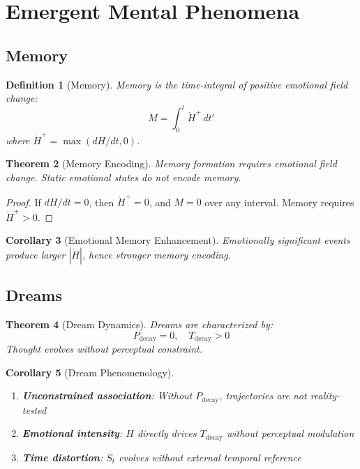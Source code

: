 \documentclass[twocolumn,amsmath,amssymb,aps,prl,superscriptaddress]{revtex4-2}
\newtheorem{theorem}{Theorem}[section]
\newtheorem{corollary}[theorem]{Corollary}
\newtheorem{definition}[theorem]{Definition}
\newcommand{\St}{S_t}
\newcommand{\Pdecay}{P_{\text{decay}}}
\newcommand{\Tdecay}{T_{\text{decay}}}
\newcommand{\Hfield}{H}
\begin{document}
\section{Emergent Mental Phenomena}
\label{sec:consequences}

\subsection{Memory}

\begin{definition}[Memory]
\label{def:memory}
Memory is the time-integral of positive emotional field change:
\begin{equation}
\boxed{M = \int_0^t \dot{\Hfield}^+ \, dt'}
\end{equation}
where $\dot{\Hfield}^+ = \max(d\Hfield/dt, 0)$.
\end{definition}

\begin{theorem}[Memory Encoding]
Memory formation requires emotional field change. Static emotional states do not encode memory.
\end{theorem}

\begin{proof}
If $d\Hfield/dt = 0$, then $\dot{\Hfield}^+ = 0$, and $M = 0$ over any interval. Memory requires $\dot{\Hfield}^+ > 0$.
\end{proof}

\begin{corollary}[Emotional Memory Enhancement]
Emotionally significant events produce larger $|\dot{\Hfield}|$, hence stronger memory encoding.
\end{corollary}

\subsection{Dreams}

\begin{theorem}[Dream Dynamics]
\label{thm:dreams}
Dreams are characterized by:
\begin{equation}
\Pdecay = 0, \quad \Tdecay > 0
\end{equation}
Thought evolves without perceptual constraint.
\end{theorem}

\begin{corollary}[Dream Phenomenology]
\begin{enumerate}
\item \textbf{Unconstrained association}: Without $\Pdecay$, trajectories are not reality-tested
\item \textbf{Emotional intensity}: $\Hfield$ directly drives $\Tdecay$ without perceptual modulation
\item \textbf{Time distortion}: $\St$ evolves without external temporal reference
\end{enumerate}
\end{corollary}
\end{document}
